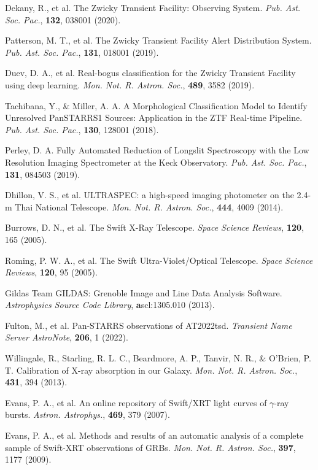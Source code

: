\documentclass{nature_plusfigure}
\newcommand{\mn}{{Mon. Not. R. Astron. Soc.}}
\newcommand{\mnras}{\mn}
\newcommand{\aap}{{Astron. Astrophys.}}
\newcommand{\pasp}{{Pub. Ast. Soc. Pac.}}
\newcommand{\ssr}{Space Science Reviews}
\begin{document}
\begin{methods}
\begin{thebibliography}{10}
  Dekany, R., et al. The Zwicky Transient Facility: Observing System. \emph{\pasp}, \textbf{132}, 038001 (2020). 

 Patterson, M. T., et al. The Zwicky Transient Facility Alert Distribution System. \emph{\pasp}, \textbf{131}, 018001 (2019). 

  Duev, D. A., et al. Real-bogus classification for the Zwicky Transient Facility using deep learning. \emph{\mnras}, \textbf{489}, 3582 (2019). 

 Tachibana, Y., \& Miller, A. A. A Morphological Classification Model to Identify Unresolved PanSTARRS1 Sources: Application in the ZTF Real-time Pipeline. \emph{\pasp}, \textbf{130}, 128001 (2018). 

 Perley, D. A. Fully Automated Reduction of Longslit Spectroscopy with the Low Resolution Imaging Spectrometer at the Keck Observatory. \emph{\pasp}, \textbf{131}, 084503 (2019). 

 Dhillon, V. S., et al. ULTRASPEC: a high-speed imaging photometer on the 2.4-m Thai National Telescope. \emph{\mnras}, \textbf{444}, 4009 (2014). 

 Burrows, D. N., et al. The Swift X-Ray Telescope. \emph{\ssr}, \textbf{120}, 165 (2005). 

 Roming, P. W. A., et al. The Swift Ultra-Violet/Optical Telescope. \emph{\ssr}, \textbf{120}, 95 (2005).

 Gildas Team GILDAS: Grenoble Image and Line Data Analysis Software. \emph{Astrophysics Source Code Library}, \textbf ascl:1305.010 (2013). 

 Fulton, M., et al. Pan-STARRS observations of AT2022tsd. \emph{Transient Name Server AstroNote}, \textbf{206}, 1 (2022). 

 Willingale, R., Starling, R. L. C., Beardmore, A. P., Tanvir, N. R., \& O'Brien, P. T. Calibration of X-ray absorption in our Galaxy. \emph{\mnras}, \textbf{431}, 394 (2013). 

 Evans, P. A., et al. An online repository of Swift/XRT light curves of $\gamma$-ray bursts. \emph{\aap}, \textbf{469}, 379 (2007). 

 Evans, P. A., et al. Methods and results of an automatic analysis of a complete sample of Swift-XRT observations of GRBs. \emph{\mnras}, \textbf{397}, 1177 (2009). 


\end{thebibliography}
\end{methods}
\end{document}
